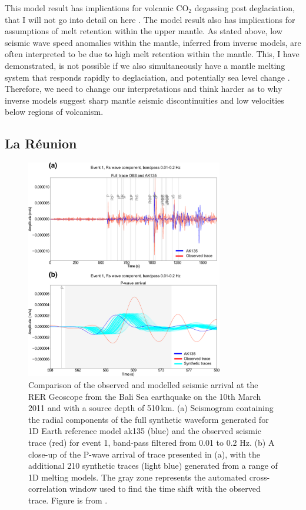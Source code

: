 This model result has implications for volcanic CO$_{2}$ degassing post deglaciation, that I will not go into detail on here \citep[see][]{armitage-etal-grl-2019}. The model result also has implications for assumptions of melt retention within the upper mantle. As stated above, low seismic wave speed anomalies within the mantle, inferred from inverse models, are often interpreted to be due to high melt retention within the mantle. This, I have demonstrated, is not possible if we also simultaneously have a mantle melting system that responds rapidly to deglaciation, and potentially sea level change \citep{huybers-2009}. Therefore, we need to change our interpretations and think harder as to why inverse models suggest sharp mantle seismic discontinuities and low velocities below regions of volcanism.

\subsection{La Réunion}

\begin{figure}
    \centering
    \includegraphics[width=8.6cm]{figures/ch2-franken1.png}
    \caption{Comparison of the observed and modelled seismic arrival at the RER Geoscope from the Bali Sea earthquake on the 10th March 2011 and with a source depth of 510\,km. (a) Seismogram containing the radial components of the full synthetic waveform generated for 1D Earth reference model ak135 (blue) and the observed seismic trace (red) for event 1, band-pass filtered from 0.01 to 0.2 Hz. (b) A close-up of the P-wave arrival of trace presented in (a), with the additional 210 synthetic traces (light blue) generated from a range of 1D melting models. The gray zone represents the automated cross-correlation window used to find the time shift with the observed trace. Figure is from \cite{franken-etal-2020}.}
    \label{fg:franken1}
\end{figure}

